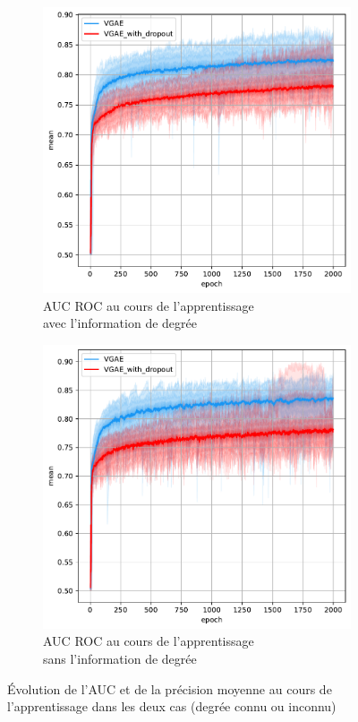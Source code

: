 \documentclass{article}
\begin{document}
\begin{figure}[H]
    \begin{subfigure}{0.45\textwidth}
      \includegraphics[width=\textwidth]{graphics/AUCs_degree_dropout_cinf.svg.pdf}
      \centering
      \caption{AUC ROC au cours de l'apprentissage\\ avec l'information de degrée}
    \end{subfigure}
    \begin{subfigure}{0.45\textwidth}
      \includegraphics[width=\textwidth]{graphics/AUCs_no_degree_dropout_cinf.svg.pdf}
      \centering
      \caption{AUC ROC au cours de l'apprentissage\\ sans l'information de degrée}
    \end{subfigure}
    \caption{Évolution de l'AUC et de la précision moyenne au cours de l'apprentissage dans les deux cas (degrée connu ou inconnu)}
    \label{fig:dropout}
\end{figure}
\end{document}
